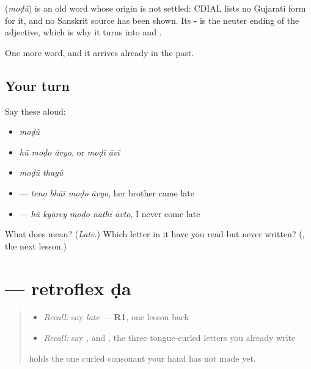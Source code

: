 \begin{cousinweb}
\textbf{} (\emph{moḍũ}) is an old word whose origin is not settled: CDIAL lists no Gujarati form for it, and no Sanskrit source has been shown. Its \textbf{-} is the neuter ending of the adjective, which is why it turns into \textbf{} and \textbf{}.
\end{cousinweb}

\begin{grammarlens}[title={What you've built}]
One more word, and it arrives already in the past.
\end{grammarlens}

\subsection*{Your turn}
Say these aloud:

\begin{itemize}
\raggedright
  \item \emph{moḍũ}
  \item \emph{hũ moḍo āvyo}, or \emph{moḍī āvī}
  \item \emph{moḍũ thayũ}
  \item \textbf{   } — \emph{teno bhāī moḍo āvyo}, her brother came late
  \item \textbf{    } — \emph{hũ kyārey moḍo nathī āvto}, I never come late
\end{itemize}

\begin{tcolorbox}[breakable,colback=teal!4,colframe=teal!35!black,title={Before you move on}]
What does \textbf{} mean? (\emph{Late}.) Which letter in it have you read but never written? (\textbf{}, the next lesson.)
\end{tcolorbox}
\section[\texorpdfstring{\gu{ડ} (ḍa)}{ડ (ḍa)}]{ — retroflex ḍa}

\label{lesson:GU-W47-dda}



\begin{quote}
\begin{itemize}
\raggedright
  \item \emph{Recall:} say \emph{late} — \textbf{R1}, one lesson back
  \item \emph{Recall:} say \textbf{}, \textbf{} and \textbf{}, the three tongue-curled letters you already write
\end{itemize}

\textbf{} holds the one curled consonant your hand has not made yet.
\end{quote}


